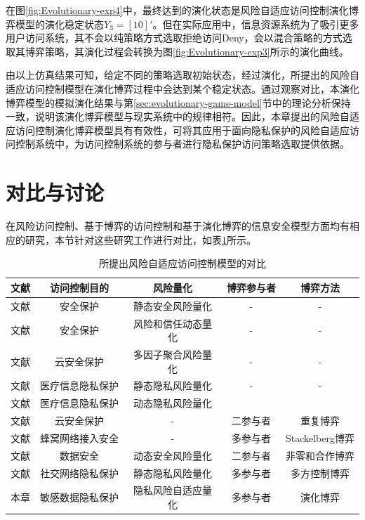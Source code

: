 \begin{enumerate}
 	在图\ref{fig:Evolutionary-exp4}中，最终达到的演化状态是风险自适应访问控制演化博弈模型的演化稳定状态${{Y}_{3}}=[10]'$。但在实际应用中，信息资源系统为了吸引更多用户访问系统，其不会以纯策略方式选取拒绝访问Deny，会以混合策略的方式选取其博弈策略，其演化过程会转换为图\ref{fig:Evolutionary-exp3}所示的演化曲线。
 \end{enumerate}


 由以上仿真结果可知，给定不同的策略选取初始状态，经过演化，所提出的风险自适应访问控制模型在演化博弈过程中会达到某个稳定状态。通过观察对比，本演化博弈模型的模拟演化结果与第\ref{sec:evolutionary-game-model}节中的理论分析保持一致，说明该演化博弈模型与现实系统中的规律相符。因此，本章提出的风险自适应访问控制演化博弈模型具有有效性，可将其应用于面向隐私保护的风险自适应访问控制系统中，为访问控制系统的参与者进行隐私保护访问策略选取提供依据。
 
 \section{对比与讨论}
 
 在风险访问控制、基于博弈的访问控制和基于演化博弈的信息安全模型方面均有相应的研究，本节针对这些研究工作进行对比，如表\ref{tab:game-model-comparision}所示。
\begin{table}[htbp]
	\caption{所提出风险自适应访问控制模型的对比}
	\label{tab:game-model-comparision}
	\centering
	\begin{tabular}{ccccc}%
		
		\toprule
		文献  &	访问控制目的&	风险量化&	博弈参与者&	博弈方法\\
		\midrule
		文献\cite{ni2010risk}&
		安全保护&	静态安全风险量化&	-&	-\\
		文献\cite{shaikh2012dynamic}&
		安全保护&	风险和信任动态量化&	-&	-\\
		文献\cite{santos2016framework}&
		云安全保护&	多因子聚合风险量化&	-&	-\\
		文献\cite{wang2011quantified}&
		医疗信息隐私保护&	静态隐私风险量化&	-&	-\\
		文献\cite{zhang2018privacy}&
		医疗信息隐私保护&	动态隐私风险量化\\		
		文献\cite{gao2018game}&
		云安全保护&	-&	二参与者&	重复博弈\\
		文献\cite{liu2016dynamic}&
		蜂窝网络接入安全&	-	&多参与者&	Stackelberg博弈\\
		文献\cite{helil2017non}&
		数据安全&	动态安全风险量化&	二参与者&	非零和合作博弈\\
		文献\cite{hu2014game}&
		社交网络隐私保护&	静态隐私风险量化&	多参与者&	多方控制博弈\\
		本章&	敏感数据隐私保护&	隐私风险自适应量化&	多参与者&	演化博弈\\
	
		\bottomrule
	\end{tabular}
\end{table}

